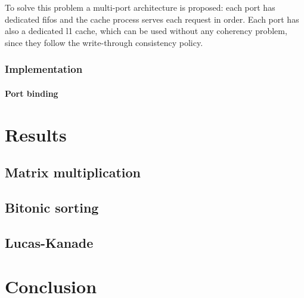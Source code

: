 \documentclass[11pt,a4paper,oneside]{memoir}
\begin{document}
To solve this problem a multi-port architecture is proposed: each port has
dedicated \acp{fifo} and the cache process serves each request in order.
Each port has also a dedicated \ac{l1} cache, which can be used without any
coherency problem, since they follow the write-through consistency policy.

\subsection{Implementation}
\subsubsection{Port binding}


\chapter{Results}
\section{Matrix multiplication}
\section{Bitonic sorting}
\section{Lucas-Kanade}

\chapter{Conclusion}

\backmatter

\printbibliography
\end{document}

